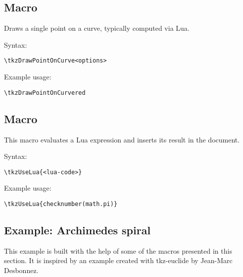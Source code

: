 
\subsection{Macro } %
\label{sub:macro_tkzDrawPointOnCurve}

Draws a single point on a curve, typically computed via Lua.

\medskip
\noindent
Syntax:

\begin{verbatim}
\tkzDrawPointOnCurve<options>
\end{verbatim}

\noindent
Example usage:

\begin{mybox}
\begin{verbatim}
\tkzDrawPointOnCurvered
\end{verbatim}
\end{mybox}


\subsection{Macro } %
\label{sub:macro_tkzUseLua}

This macro evaluates a Lua expression and inserts its result in the document.

\medskip
\noindent
Syntax:

\begin{verbatim}
\tkzUseLua{<lua-code>}
\end{verbatim}

\noindent
Example usage:

\begin{mybox}
\begin{verbatim}
\tkzUseLua{checknumber(math.pi)}
\end{verbatim}
\end{mybox}


\subsection{Example: Archimedes spiral} %
\label{sub:example_archimedes_spiral}

This example is built with the help of some of the macros presented in this section. It is inspired by an example created with tkz-euclide by Jean-Marc Desbonnez.

